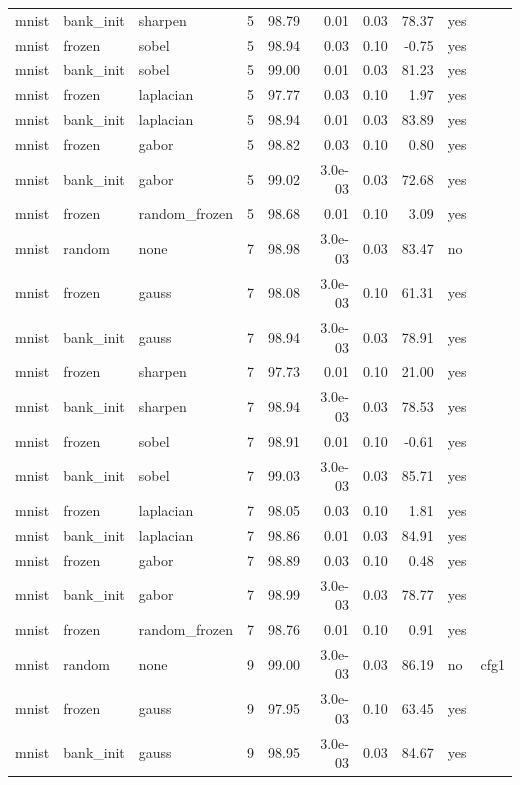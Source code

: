 \begin{table}[htbp]
{\begin{tabular}{@{}lllrrrrrll@{}}
mnist & bank\_init & sharpen & 5 & 98.79 & 0.01 & 0.03 & 78.37 & yes &  \\
mnist & frozen & sobel & 5 & 98.94 & 0.03 & 0.10 & -0.75 & yes &  \\
mnist & bank\_init & sobel & 5 & 99.00 & 0.01 & 0.03 & 81.23 & yes &  \\
mnist & frozen & laplacian & 5 & 97.77 & 0.03 & 0.10 & 1.97 & yes &  \\
mnist & bank\_init & laplacian & 5 & 98.94 & 0.01 & 0.03 & 83.89 & yes &  \\
mnist & frozen & gabor & 5 & 98.82 & 0.03 & 0.10 & 0.80 & yes &  \\
mnist & bank\_init & gabor & 5 & 99.02 & 3.0e-03 & 0.03 & 72.68 & yes &  \\
mnist & frozen & random\_frozen & 5 & 98.68 & 0.01 & 0.10 & 3.09 & yes &  \\
mnist & random & none & 7 & 98.98 & 3.0e-03 & 0.03 & 83.47 & no &  \\
mnist & frozen & gauss & 7 & 98.08 & 3.0e-03 & 0.10 & 61.31 & yes &  \\
mnist & bank\_init & gauss & 7 & 98.94 & 3.0e-03 & 0.03 & 78.91 & yes &  \\
mnist & frozen & sharpen & 7 & 97.73 & 0.01 & 0.10 & 21.00 & yes &  \\
mnist & bank\_init & sharpen & 7 & 98.94 & 3.0e-03 & 0.03 & 78.53 & yes &  \\
mnist & frozen & sobel & 7 & 98.91 & 0.01 & 0.10 & -0.61 & yes &  \\
mnist & bank\_init & sobel & 7 & 99.03 & 3.0e-03 & 0.03 & 85.71 & yes &  \\
mnist & frozen & laplacian & 7 & 98.05 & 0.03 & 0.10 & 1.81 & yes &  \\
mnist & bank\_init & laplacian & 7 & 98.86 & 0.01 & 0.03 & 84.91 & yes &  \\
mnist & frozen & gabor & 7 & 98.89 & 0.03 & 0.10 & 0.48 & yes &  \\
mnist & bank\_init & gabor & 7 & 98.99 & 3.0e-03 & 0.03 & 78.77 & yes &  \\
mnist & frozen & random\_frozen & 7 & 98.76 & 0.01 & 0.10 & 0.91 & yes &  \\
mnist & random & none & 9 & 99.00 & 3.0e-03 & 0.03 & 86.19 & no & cfg1 \\
mnist & frozen & gauss & 9 & 97.95 & 3.0e-03 & 0.10 & 63.45 & yes &  \\
mnist & bank\_init & gauss & 9 & 98.95 & 3.0e-03 & 0.03 & 84.67 & yes &  \\

\end{tabular}}
\end{table}
